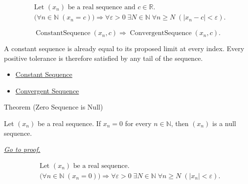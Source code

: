 \begin{remark*}
\[
\begin{aligned}
&\text{Let } (x_n) \text{ be a real sequence and } c \in \mathbb{R}.\\
&\bigl(\forall n \in \mathbb{N}\;(x_n = c)\bigr)
\Longrightarrow
\forall \varepsilon > 0\;
\exists N \in \mathbb{N}\;
\forall n \ge N\;(|x_n - c| < \varepsilon).
\end{aligned}
\]
\end{remark*}

\begin{remark*}
\[
\operatorname{ConstantSequence}(x_n,c)
\Longrightarrow
\operatorname{ConvergentSequence}(x_n,c).
\]
\end{remark*}

\begin{remark*}[Interpretation]
A constant sequence is already equal to its proposed limit at every index.
Every positive tolerance is therefore satisfied by any tail of the sequence.
\end{remark*}

\begin{dependencies}
\begin{itemize}
  \item \hyperref[def:constant-sequence]{Constant Sequence}
  \item \hyperref[def:convergent-sequence]{Convergent Sequence}
\end{itemize}
\end{dependencies}


\begin{theorembox}{Theorem (Zero Sequence is Null)}
\begin{theorem}
\label{thm:zero-sequence-is-null}
Let $(x_n)$ be a real sequence. If $x_n = 0$ for every $n \in \mathbb{N}$,
then $(x_n)$ is a null sequence.

\smallskip
\noindent
\hyperref[prf:zero-sequence-is-null]{\textit{Go to proof.}}
\end{theorem}
\end{theorembox}

\begin{remark*}
\[
\begin{aligned}
&\text{Let } (x_n) \text{ be a real sequence.}\\
&\bigl(\forall n \in \mathbb{N}\;(x_n = 0)\bigr)
\Longrightarrow
\forall \varepsilon > 0\;
\exists N \in \mathbb{N}\;
\forall n \ge N\;(|x_n| < \varepsilon).
\end{aligned}
\]
\end{remark*}

